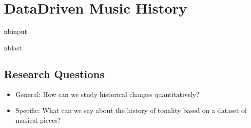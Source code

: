 \documentclass[letterpaper,10pt,english]{sphinxmanual}
\begin{document}
\chapter{Data\sphinxhyphen{}Driven Music History}
\label{\detokenize{05_data-driven_music_history:Data-Driven-Music-History}}\label{\detokenize{05_data-driven_music_history::doc}}
\begin{sphinxuseclass}{nbinput}
\begin{sphinxuseclass}{nblast}
{
\begin{sphinxVerbatim}[commandchars=\\\{\}]
\llap{\color{nbsphinxin}[1]:\,\hspace{\fboxrule}\hspace{\fboxsep}}    
 
    
 
    
   
\end{sphinxVerbatim}
}

\end{sphinxuseclass}
\end{sphinxuseclass}

\section{Research Questions}
\label{\detokenize{05_data-driven_music_history:Research-Questions}}\begin{itemize}
\item {} 
\sphinxAtStartPar
General: How can we study historical changes quantitatively?

\item {} 
\sphinxAtStartPar
Specific: What can we say about the history of tonality based on a dataset of musical pieces?

\end{itemize}
\end{document}
